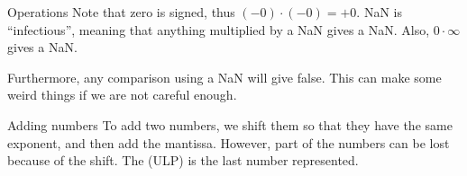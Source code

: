 \documentclass[a4paper]{article}
\begin{document}
\begin{parag}{Operations}
    Note that zero is signed, thus $\left(-0\right)\cdot \left(-0\right) = +0$. NaN is ``infectious'', meaning that anything multiplied by a NaN gives a NaN. Also, $0\cdot \infty$ gives a NaN.

    Furthermore, any comparison using a NaN will give false. This can make some weird things if we are not careful enough.
\end{parag}

\begin{parag}{Adding numbers}
    To add two numbers, we shift them so that they have the same exponent, and then add the mantissa. However, part of the numbers can be lost because of the shift. The  (ULP) is the last number represented.
\end{parag}
\end{document}
